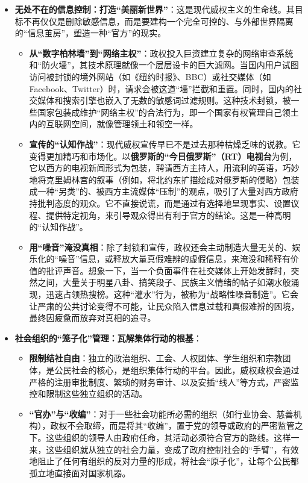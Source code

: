 \begin{itemize}
    \item \textbf{无处不在的信息控制：打造“美丽新世界”}：这是现代威权主义的生命线。其目标不再仅仅是删除敏感信息，而是要建构一个完全可控的、与外部世界隔离的“信息茧房”，塑造一种“官方”的现实。
    \begin{itemize}
        \item \textbf{从“数字柏林墙”到“网络主权”}：政权投入巨资建立复杂的网络审查系统和“防火墙”，其技术原理就像一个层层设卡的巨大滤网。当国内用户试图访问被封锁的境外网站（如《纽约时报》、BBC）或社交媒体（如Facebook、Twitter）时，请求会被这道“墙”拦截和重置。同时，国内的社交媒体和搜索引擎也嵌入了无数的敏感词过滤规则。这种技术封锁，被一些国家包装成维护“网络主权”的合法行为，即一个国家有权管理自己领土内的互联网空间，就像管理领土和领空一样。
        \item \textbf{宣传的“认知作战”}：现代威权宣传早已不是过去那种枯燥乏味的说教。它变得更加精巧和市场化。以\textbf{俄罗斯的“今日俄罗斯”（RT）电视台}为例，它以西方的电视新闻形式为包装，聘请西方主持人，用流利的英语，巧妙地将克里姆林宫的叙事（例如，将北约东扩描绘成对俄罗斯的侵略）包装成一种“另类”的、被西方主流媒体“压制”的观点，吸引了大量对西方政府持批判态度的观众。它不直接说谎，而是通过有选择地呈现事实、设置议程、提供特定视角，来引导观众得出有利于官方的结论。这是一种高明的“认知作战”。
        \item \textbf{用“噪音”淹没真相}：除了封锁和宣传，政权还会主动制造大量无关的、娱乐化的“噪音”信息，或释放大量真假难辨的虚假信息，来淹没和稀释有价值的批评声音。想象一下，当一个负面事件在社交媒体上开始发酵时，突然之间，大量关于明星八卦、搞笑段子、民族主义情绪的帖子如潮水般涌现，迅速占领热搜榜。这种“灌水”行为，被称为“战略性噪音制造”。它会让严肃的公共讨论变得不可能，让民众陷入信息过载和真假难辨的困境，最终因疲惫而放弃对真相的追寻。
    \end{itemize}
    \item \textbf{社会组织的“笼子化”管理：瓦解集体行动的根基}：
    \begin{itemize}
        \item \textbf{限制结社自由}：独立的政治组织、工会、人权团体、学生组织和宗教团体，是公民社会的核心，是组织集体行动的平台。因此，威权政权会通过严格的注册审批制度、繁琐的财务审计、以及安插“线人”等方式，严密监控和限制这些独立组织的活动。
        \item \textbf{“官办”与“收编”}：对于一些社会功能所必需的组织（如行业协会、慈善机构），政权不会取缔，而是将其“收编”，置于党的领导或政府的严密监管之下。这些组织的领导人由政府任命，其活动必须符合官方的路线。这样一来，这些组织就从独立的社会力量，变成了政府控制社会的“手臂”，有效地阻止了任何有组织的反对力量的形成，将社会“原子化”，让每个公民都孤立地直接面对国家机器。

\end{itemize}
\end{itemize}
